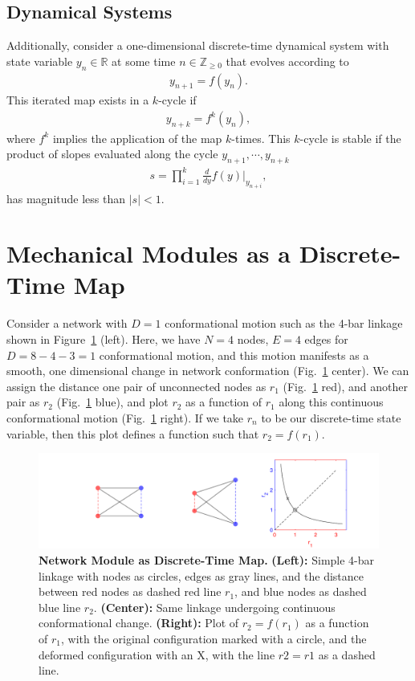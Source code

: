 \documentclass[12pt]{revtex4-1}
\newcommand{\real}{\mathbb{R}}
\begin{document}
\subsection{Dynamical Systems}
Additionally, consider a one-dimensional discrete-time dynamical system with state variable $y_n \in \real$ at some time $n \in \mathbb{Z}_{\geq 0}$ that evolves according to
\begin{align*}
y_{n+1} = f(y_n). 
\end{align*}
This iterated map exists in a $k$-cycle if
\begin{align*}
y_{n+k} = f^k(y_n),
\end{align*}
where $f^k$ implies the application of the map $k$-times. This $k$-cycle is stable if the product of slopes evaluated along the cycle $y_{n+1},\dotsm,y_{n+k}$
\begin{align*}
s = \prod_{i=1}^k \frac{d}{dy}f(y)\bigg|_{y_{n+i}},
\end{align*}
has magnitude less than $|s| < 1$. 




\section{Mechanical Modules as a Discrete-Time Map}
Consider a network with $D = 1$ conformational motion such as the 4-bar linkage shown in Figure~\ref{fig:4bar} (left). Here, we have $N=4$ nodes, $E = 4$ edges for $D = 8-4-3 = 1$ conformational motion, and this motion manifests as a smooth, one dimensional change in network conformation (Fig.~\ref{fig:4bar} center). We can assign the distance one pair of unconnected nodes as $r_1$ (Fig.~\ref{fig:4bar} red), and another pair as $r_2$ (Fig.~\ref{fig:4bar} blue), and plot $r_2$ as a function of $r_1$ along this continuous conformational motion (Fig.~\ref{fig:4bar} right). If we take $r_n$ to be our discrete-time state variable, then this plot defines a function such that $r_2 = f(r_1)$. 

\begin{figure}[h!]
	\centering
	\includegraphics[width=1.0\columnwidth]{4bar.pdf}
	\caption{\textbf{Network Module as Discrete-Time Map.} \textbf{(Left):} Simple 4-bar linkage with nodes as circles, edges as gray lines, and the distance between red nodes as dashed red line $r_1$, and blue nodes as dashed blue line $r_2$. \textbf{(Center):} Same linkage undergoing continuous conformational change. \textbf{(Right):} Plot of $r_2 = f(r_1)$ as a function of $r_1$, with the original configuration marked with a circle, and the deformed configuration with an X, with the line $r2 = r1$ as a dashed line.}
	\label{fig:4bar}
\end{figure}
\end{document}
